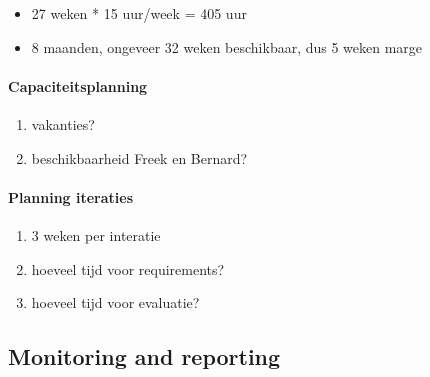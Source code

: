 \begin{itemize}
 \item 27 weken * 15 uur/week = 405 uur
 \item 8 maanden, ongeveer 32 weken beschikbaar, dus 5 weken marge
\end{itemize}



\paragraph{Capaciteitsplanning}

\begin{enumerate}
 \item vakanties?
 \item beschikbaarheid Freek en Bernard?
\end{enumerate}

\paragraph{Planning iteraties}
\begin{enumerate}
 \item 3 weken per interatie
 \item hoeveel tijd voor requirements?
 \item hoeveel tijd voor evaluatie?
\end{enumerate}






\subsection{Monitoring and reporting}
